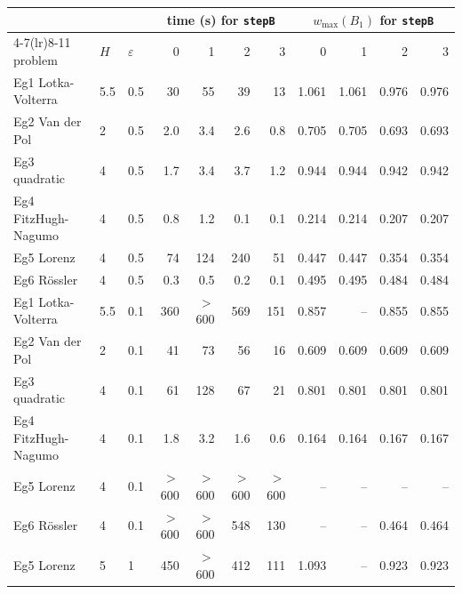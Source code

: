 \begin{tabular}{lll rrrr rrrr}
\toprule
& & & \multicolumn{4}{c}{time (s) for \texttt{stepB}} & \multicolumn{4}{c}{$w_{\max}(B_1)$ for \texttt{stepB}} \\
\cmidrule(lr){4-7}\cmidrule(lr){8-11}
problem & $H$ & $\varepsilon$ & 0 & 1 & 2 & 3 & 0 & 1 & 2 & 3 \\
\midrule
Eg1 Lotka-Volterra & 5.5 & 0.5 & 30 & 55 & 39 & 13 & 1.061 & 1.061 & 0.976 & 0.976 \\
Eg2 Van der Pol & 2 & 0.5 & 2.0 & 3.4 & 2.6 & 0.8 & 0.705 & 0.705 & 0.693 & 0.693 \\
Eg3 quadratic & 4 & 0.5 & 1.7 & 3.4 & 3.7 & 1.2 & 0.944 & 0.944 & 0.942 & 0.942 \\
Eg4 FitzHugh-Nagumo & 4 & 0.5 & 0.8 & 1.2 & 0.1 & 0.1 & 0.214 & 0.214 & 0.207 & 0.207 \\
Eg5 Lorenz & 4 & 0.5 & 74 & 124 & 240 & 51 & 0.447 & 0.447 & 0.354 & 0.354 \\
Eg6 R\"ossler & 4 & 0.5 & 0.3 & 0.5 & 0.2 & 0.1 & 0.495 & 0.495 & 0.484 & 0.484 \\
\addlinespace
Eg1 Lotka-Volterra & 5.5 & 0.1 & 360 & $>$600 & 569 & 151 & 0.857 & -- & 0.855 & 0.855 \\
Eg2 Van der Pol & 2 & 0.1 & 41 & 73 & 56 & 16 & 0.609 & 0.609 & 0.609 & 0.609 \\
Eg3 quadratic & 4 & 0.1 & 61 & 128 & 67 & 21 & 0.801 & 0.801 & 0.801 & 0.801 \\
Eg4 FitzHugh-Nagumo & 4 & 0.1 & 1.8 & 3.2 & 1.6 & 0.6 & 0.164 & 0.164 & 0.167 & 0.167 \\
Eg5 Lorenz & 4 & 0.1 & $>$600 & $>$600 & $>$600 & $>$600 & -- & -- & -- & -- \\
Eg6 R\"ossler & 4 & 0.1 & $>$600 & $>$600 & 548 & 130 & -- & -- & 0.464 & 0.464 \\
\addlinespace
Eg5 Lorenz & 5 & 1 & 450 & $>$600 & 412 & 111 & 1.093 & -- & 0.923 & 0.923 \\
\bottomrule
\end{tabular}
